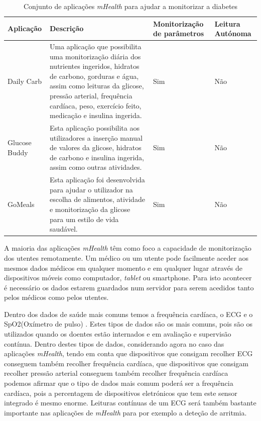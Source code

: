 \begin{table}[H]
\centering

\begin{tabularx}{1\textwidth}{|p{3cm}|p{6.1cm}|p{2.7cm}|p{2cm}|}
\rowcolor[HTML]{FFCE93} \hline
\textbf{Aplicação} &  \textbf{Descrição} &  \textbf{Monitorização de parâmetros}  &  \textbf{Leitura Autónoma}  \\
\hline
Daily Carb \cite{mhealth_app1} & Uma aplica\c c\~ao que possibilita uma monitoriza\c c\~ao di\'aria dos nutrientes ingeridos, hidratos de carbono, gorduras e \'agua, assim como leituras da glicose, press\~ao arterial, frequ\^encia card\'iaca, peso, exerc\'icio feito, medica\c c\~ao e insulina ingerida. & Sim & Não \\ \hline

Glucose Buddy \cite{mhealth_app2} & Esta aplica\c c\~ao possibilita aos utilizadores a inser\c c\~ao manual de valores da glicose, hidratos de carbono e insulina ingerida, assim como outras atividades. & Sim & Não \\ \hline
GoMeals \cite{mhealth_app3} & Esta aplica\c c\~ao foi desenvolvida para ajudar o utilizador na escolha de alimentos, atividade e monitoriza\c c\~ao da glicose  para um  estilo de vida saud\'avel. & Sim & Não \\ \hline
\end{tabularx}

\caption{Conjunto de aplicações \textit{mHealth} para ajudar a monitorizar a diabetes}
\label{t:aplications-glicose}
\end{table}

A maioria das aplica\c c\~oes \textit{mHealth} t\^em como foco a capacidade de monitoriza\c c\~ao dos utentes remotamente. Um m\'edico ou um utente pode facilmente aceder aos mesmos dados m\'edicos em qualquer momento e em qualquer lugar atrav\'es de dispositivos m\'oveis como computador, \textit{tablet} ou smartphone. Para isto acontecer é necessário os dados estarem guardados num servidor para serem acedidos tanto pelos médicos como pelos utentes.

Dentro dos dados de saúde mais comuns temos a frequência cardíaca, o \gls{ECG} e o SpO2(Oxímetro de pulso) \cite{wearable-trends}. Estes tipos de dados são os mais comuns, pois são os utilizados quando os doentes estão internados e em avaliação e supervisão contínua.
Dentro destes tipos de dados, considerando agora no caso das aplicações \textit{mHealth}, tendo em conta que dispositivos que consigam recolher \gls{ECG} conseguem também recolher frequência cardíaca, que dispositivos que consigam recolher pressão arterial conseguem também recolher frequência cardíaca podemos afirmar que o tipo de dados mais comum poderá ser a frequência cardíaca, pois a percentagem de dispositivos eletrónicos que tem este sensor integrado é mesmo enorme. Leituras contínuas de um \gls{ECG} será também bastante importante nas aplicações de \textit{mHealth} para por exemplo a deteção de arritmia.



